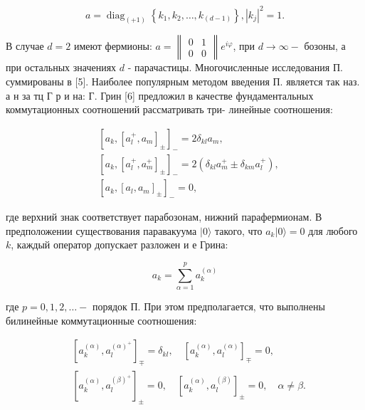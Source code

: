 \documentclass[10pt]{article}
\begin{document}
\[

a=\operatorname{diag}_{(+1)}\left\{k_{1}, k_{2}, \ldots, k_{(d-1)}\right\},\left|k_{j}\right|^{2}=1 .

\]



В случае $d=2$ имеют фермионы: $a=\left\|\begin{array}{ll}0 & 1 \\ 0 & 0\end{array}\right\| e^{i \varphi}$, при $d \rightarrow \infty-$ бозоны, а при остальных значениях $d$ - парачастицы. Многочисленные исследования П. суммированы в [5]. Наиболее популярным методом введения П. является так наз. а н за тц Г р и на: Г. Грин [6] предложил в качестве фундаментальных коммутационных соотношений рассматривать три- линейные соотношения:



\[

\begin{aligned}

& {\left[a_{k},\left[a_{l}^{+}, a_{m}\right]_{ \pm}\right]_{-}=2 \delta_{k l} a_{m},} \\

& {\left[a_{k},\left[a_{l}^{+}, a_{m}^{+}\right]_{ \pm}\right]_{-}=2\left(\delta_{k l} a_{m}^{+} \pm \delta_{k m} a_{l}^{+}\right),} \\

& {\left[a_{k},\left[a_{l}, a_{m}\right]_{ \pm}\right]_{-}=0,}

\end{aligned}

\]



где верхний знак соответствует парабозонам, нижний парафермионам. В предположении существования паравакуума $|0\rangle$ такого, что $a_{k}|0\rangle=0$ для любого $k$, каждый оператор допускает разложен и е Грина:



\[

a_{k}=\sum_{\alpha=1}^{p} a_{k}^{(\alpha)}

\]



где $p=0,1,2, \ldots-$ порядок П. При этом предполагается, что выполнены билинейные коммутационные соотношения:



\[

\begin{aligned}

& {\left[a_{k}^{(\alpha)}, a_{l}^{(\alpha)^{+}}\right]_{\mp}=\delta_{k l}, \quad\left[a_{k}^{(\alpha)}, a_{l}^{(\alpha)}\right]_{\mp}=0,} \\

& {\left[a_{k}^{(\alpha)}, a_{l}^{(\beta)^{+}}\right]_{ \pm}=0, \quad\left[a_{k}^{(\alpha)}, a_{l}^{(\beta)}\right]_{ \pm}=0, \quad \alpha \neq \beta .}

\end{aligned}

\]
\end{document}
